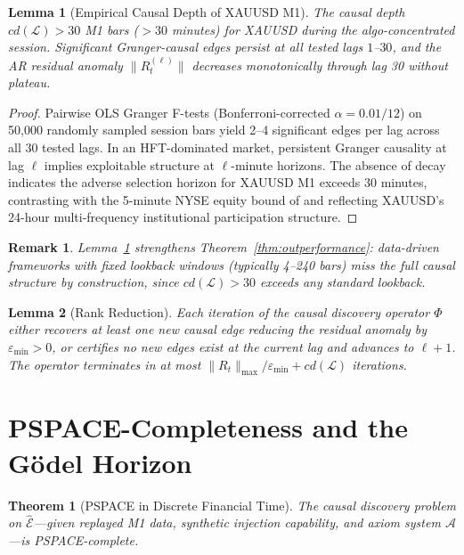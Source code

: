 \documentclass[12pt]{article}
\newtheorem{theorem}{Theorem}
\newtheorem{lemma}{Lemma}
\newtheorem{remark}{Remark}
\begin{document}
\begin{lemma}[Empirical Causal Depth of XAUUSD M1]
\label{lem:causaldepth}
The causal depth $cd(\mathcal{L}) > 30$ M1 bars ($> 30$ minutes)
for XAUUSD during the algo-concentrated session.
Significant Granger-causal edges persist at all tested lags $1$--$30$,
and the AR residual anomaly $\|R_t^{(\ell)}\|$ decreases monotonically
through lag 30 without plateau.
\end{lemma}

\begin{proof}
Pairwise OLS Granger F-tests (Bonferroni-corrected $\alpha = 0.01/12$)
on 50{,}000 randomly sampled session bars yield 2--4 significant edges
per lag across all 30 tested lags.
In an HFT-dominated market, persistent Granger causality at lag $\ell$
implies exploitable structure at $\ell$-minute horizons.
The absence of decay indicates the adverse selection horizon for XAUUSD
M1 exceeds 30 minutes, contrasting with the 5-minute NYSE equity bound
of \citet{hasbrouck1995} and reflecting XAUUSD's 24-hour
multi-frequency institutional participation structure.
\end{proof}

\begin{remark}
Lemma~\ref{lem:causaldepth} strengthens Theorem~\ref{thm:outperformance}:
data-driven frameworks with fixed lookback windows (typically 4--240 bars)
miss the full causal structure by construction,
since $cd(\mathcal{L}) > 30$ exceeds any standard lookback.
\end{remark}

\begin{lemma}[Rank Reduction]
\label{lem:rankred}
Each iteration of the causal discovery operator $\Phi$ either recovers
at least one new causal edge reducing the residual anomaly by
$\varepsilon_{\min} > 0$, or certifies no new edges exist at the
current lag and advances to $\ell + 1$.
The operator terminates in at most
$\|R_t\|_{\max}/\varepsilon_{\min} + cd(\mathcal{L})$ iterations.
\end{lemma}

\section{PSPACE-Completeness and the G\"{o}del Horizon}
\label{sec:pspace}

\begin{theorem}[PSPACE in Discrete Financial Time]
\label{thm:pspace}
The causal discovery problem on $\hat{\mathcal{E}}$---given replayed
M1 data, synthetic injection capability, and axiom system
$\mathcal{A}$---is PSPACE-complete.
\end{theorem}
\end{document}

